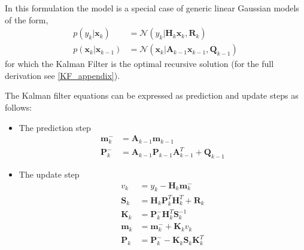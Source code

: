 In this formulation the model is a special case of generic linear Gaussian
models of the form, 
\begin{align*}
  p(y_k | \mathbf{x}_k) &= \mathcal{N}(y_k | \mathbf{H}_k \mathbf{x}_k,
                          \mathbf{R}_k) \\
  p(\mathbf{x}_k | \mathbf{x}_{k-1}) &= \mathcal{N}(\mathbf{x}_k
                                      | \mathbf{A}_{k-1} \mathbf{x}_{k-1},
                                      \mathbf{Q}_{k-1})
\end{align*}
for which the Kalman Filter \citep{Kalman:1960} is the optimal recursive solution
(for the full derivation see  \cref{KF_appendix}).


The Kalman filter equations can be expressed as
prediction and update steps as follows:
\begin{itemize}
\item The prediction step
  \begin{equation}
    \label{KF_prediction}
    \begin{aligned}
      \mathbf{m}_k^- &= \mathbf{A}_{k-1} \mathbf{m}_{k-1} \\
      \mathbf{P}_k^- &= \mathbf{A}_{k-1} \mathbf{P}_{k-1} \mathbf{A}^T_{k-1}
      + \mathbf{Q}_{k-1}
    \end{aligned}
  \end{equation}

\item The update step
  \begin{equation}
    \label{KF_update}
    \begin{aligned}
      v_k &= y_k - \mathbf{H}_k \mathbf{m}_k^- \\
      \mathbf{S}_k &= \mathbf{H}_k \mathbf{P}_k^T \mathbf{H}^T_k +
      \mathbf{R}_k \\
      \mathbf{K}_k &= \mathbf{P}_k^- \mathbf{H}_k^T \mathbf{S}_k^{-1} \\
      \mathbf{m}_k &= \mathbf{m}_k^- + \mathbf{K}_k v_k \\
      \mathbf{P}_k &= \mathbf{P}_k^- - \mathbf{K}_k \mathbf{S}_k \mathbf{K}_k^T
    \end{aligned}
  \end{equation}
\end{itemize}


